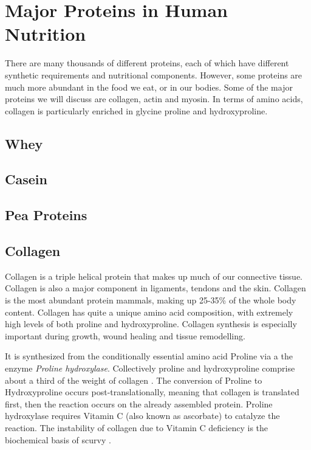 \documentclass{tufte-handout}
\begin{document}
\section{Major Proteins in Human Nutrition}
There are many thousands of different proteins, each of which have different synthetic requirements and nutritional components.  However, some proteins are much more abundant in the food we eat, or in our bodies.  Some of the major proteins we will discuss are collagen, actin and myosin.  In terms of amino acids, collagen is particularly enriched in glycine proline and hydroxyproline.

\subsection{Whey}

\subsection{Casein}

\subsection{Pea Proteins}

\subsection{Collagen}
Collagen is a triple helical protein that makes up much of our connective tissue.  Collagen is also a major component in ligaments, tendons and the skin.  Collagen is the most abundant protein mammals, making up 25-35\% of the whole body content.  Collagen has quite a unique amino acid composition, with extremely high levels of both proline and hydroxyproline.  Collagen synthesis is especially important during growth, wound healing and tissue remodelling.

  It is synthesized from the conditionally essential amino acid Proline via a the enzyme \emph{Proline hydroxylase}.  Collectively proline and hydroxyproline comprise about a third of the weight of collagen \citep{Bowes1948}.  The conversion of Proline to Hydroxyproline occurs post-translationally, meaning that collagen is translated first, then the reaction occurs on the already assembled protein.  Proline hydroxylase requires Vitamin C (also known as ascorbate) to catalyze the reaction.  The instability of collagen due to Vitamin C deficiency is the biochemical basis of scurvy \cite{Lind1753}. 



\end{document}
